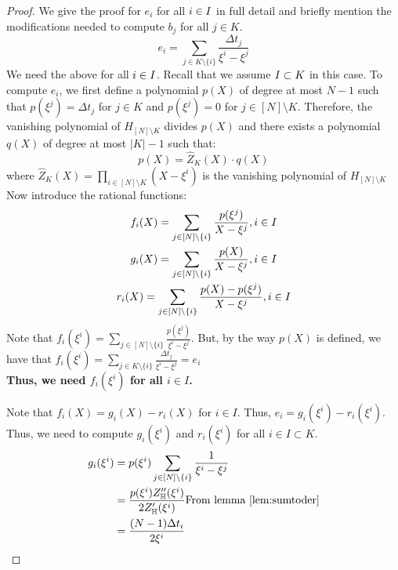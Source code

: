\begin{proof}

    We give the proof for $e_i$ for all $i \in I$ in full detail and briefly mention the modifications needed to compute $b_j$ for all $j \in K$. \\

    \begin{equation}\label{eq:ei}
    e_i = \sum_{j\in K\setminus \{i\}} \frac{\Delta t_j}{\xi^i - \xi^j}
    \end{equation}
    We need the above for all $i \in I$. Recall that we assume $I \subset K$ in this case.
    To compute $e_i$, we first define a polynomial $p(X)$ of degree at most $N-1$ such that
    $p(\xi^j)=\Delta t_j$ for $j\in K$ and $p(\xi^j)=0$ for $j \in [N]\setminus K$.
    Therefore, the vanishing polynomial of $H_{[N]\setminus K}$ divides $p(X)$ and
    there exists a polynomial $q(X)$ of degree at most $|K|-1$ such that:
    \begin{equation}\label{eq:px}
    p(X) = \hat{Z}_K(X)\cdot q(X)
    \end{equation}
    where $\hat{Z}_K(X)=\prod_{i\in [N]\setminus K}(X-\xi^i)$ is the vanishing polynomial of $H_{[N]\setminus K}$\\

    Now introduce the rational functions:
    \begin{gather}\label{eq:fgr}
    f_i(X) = \sum_{j\in [N]\setminus \{i\}}\frac{p(\xi^j)}{X-\xi^j}, i\in I \\
    g_i(X) = \sum_{j\in [N]\setminus \{i\}}\frac{p(X)}{X-\xi^j}, i\in I \\
    r_i(X) = \sum_{j\in [N]\setminus \{i\}}\frac{p(X) - p(\xi^j)}{X-\xi^j}, i\in I
    \end{gather}
    Note that $f_i(\xi^i)=\sum_{j\in [N]\setminus \{i\}}\frac{p(\xi^j)}{\xi^i-\xi^j}$.
    But, by the way $p(X)$ is defined, we have that $f_i(\xi^i)=\sum_{j\in K\setminus \{i\}}\frac{\Delta t_j}{\xi^i-\xi^j}=e_i$\\
    \textbf{Thus, we need $f_i(\xi^i)$ for all $i \in I$.}

    Note that $f_i(X) = g_i(X) - r_i(X)$ for $i\in I$.
    Thus, $e_i=g_i(\xi^i)-r_i(\xi^i)$.
    Thus, we need to compute $g_i(\xi^i)$ and $r_i(\xi^i)$ for all $i \in I \subset K$.
    \begin{align*}
        g_i(\xi^i) &= p(\xi^i)\sum_{j\in [N]\setminus \{i\}} \frac{1}{\xi^i-\xi^j} \\
        &= \frac{p(\xi^i)Z_{\mathbb{H}}''(\xi^i)}{2 Z_{\mathbb{H}}'(\xi^i)} \text{From lemma \ref{lem:sumtoder}} \\
        &= \frac{(N-1)\Delta t_i}{2\xi^i}
    \end{align*}


\end{proof}
